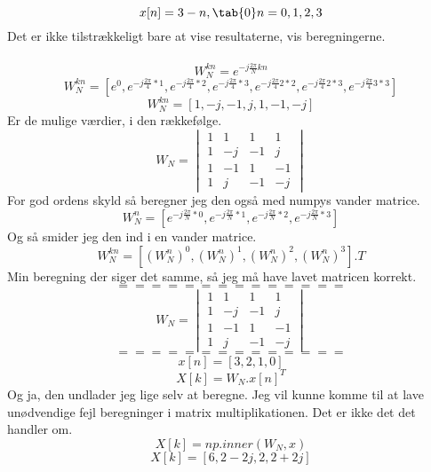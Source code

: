 \begin{rubrik}[Eksamenssæt2022]
\begin{eksamensOpgave}
\begin{UnderOpgave}
        \end{UnderOpgave}
    \end{eksamensOpgave}
    \begin{eksamensOpgave}[DFT ]
        \begin{UnderOpgave}[Beregn \text{$W_N$} for N = 4 og beregn derefter DFT transformationen af signalet]
            \[x[n] = 3 - n, \tab{0} n = 0, 1, 2, 3\]
            Det er ikke tilstrækkeligt bare at vise resultaterne, vis beregningerne.\\\\
            \[W_N^{kn} = e^{ - j \frac{2\pi}{N} kn}\]
            \[W_N^{kn} = [e^{0}, e^{ - j \frac{2\pi}{4} * 1}, e^{ - j \frac{2\pi}{4} * 2},  e^{ - j \frac{2\pi}{4} * 3}, e^{ - j \frac{2\pi}{4} 2 * 2}, e^{ - j \frac{2\pi}{4} 2 * 3}, e^{ - j \frac{2\pi}{4} 3 * 3}]\]
            \[W_N^{kn} = [1, -j, -1, j, 1, -1, -j]\]
            Er de mulige værdier, i den rækkefølge.
            \[W_N = \begin{vmatrix}
                1 &  1 &  1 &  1 \\
                1 & -j & -1 &  j \\
                1 & -1 &  1 & -1 \\
                1 &  j & -1 & -j 
            \end{vmatrix}\]
            For god ordens skyld så beregner jeg den også med numpys vander matrice. 
            \[W_N^n = [e^{ - j \frac{2\pi}{N} * 0}, e^{ - j \frac{2\pi}{N} * 1}, e^{ - j \frac{2\pi}{N} * 2}, e^{ - j \frac{2\pi}{N} * 3}]\]
            Og så smider jeg den ind i en vander matrice. 
            \[W_N^{kn} = [(W_N^n)^0, (W_N^n)^1, (W_N^n)^2, (W_N^n)^3].T \]
            Min beregning der siger det samme, så jeg må have lavet matricen korrekt. 
            \[==============\]
            \[W_N = \begin{vmatrix}
                1 &  1 &  1 &  1 \\
                1 & -j & -1 &  j \\
                1 & -1 &  1 & -1 \\
                1 &  j & -1 & -j 
            \end{vmatrix}\]
            \[==============\]
            \[x[n] = [3, 2, 1, 0]\]
            \[X[k] = W_N . x[n]^T\]
            Og ja, den undlader jeg lige selv at beregne. Jeg vil kunne komme til at lave unødvendige fejl beregninger i matrix multiplikationen. Det er ikke det det handler om. 
            \[X[k] = np.inner(W_N, x)\]
            \[X[k] = [6, 2 - 2j, 2 , 2 + 2j]\]

\end{UnderOpgave}
\end{eksamensOpgave}
\end{rubrik}
